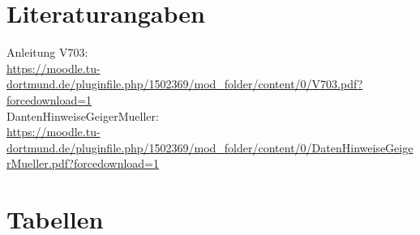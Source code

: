 \section{Literaturangaben}

Anleitung V703:\\
\url{https://moodle.tu-dortmund.de/pluginfile.php/1502369/mod_folder/content/0/V703.pdf?forcedownload=1}\\
DantenHinweiseGeigerMueller:\\
\url{https://moodle.tu-dortmund.de/pluginfile.php/1502369/mod_folder/content/0/DatenHinweiseGeigerMueller.pdf?forcedownload=1}\\

\section{Tabellen}
